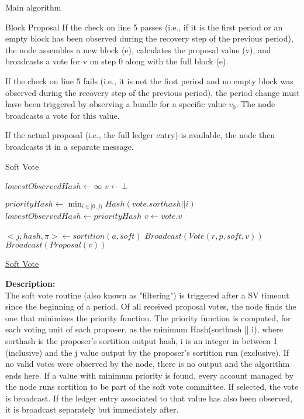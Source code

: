 \documentclass[10pt,a4paper]{article}
\begin{document}
\begin{section}{Main algorithm}
\begin{subsection}{Block Proposal}
If the check on line 5 passes (i.e., if it is the first period or an empty block
 has been observed during the recovery step of the previous period), 
 the node assembles a new block (e), calculates the proposal value (v), 
 and broadcasts a vote for v on step 0 along with the full block (e).

If the check on line 5 fails (i.e., it is not the first period and no 
empty block was observed during the recovery step of the previous period), 
the period change must have been triggered by observing a bundle for a specific value $v_0$. 
The node broadcasts a vote for this value.

If the actual proposal (i.e., the full ledger entry) is available, the node then broadcasts it 
in a separate message.


\end{subsection}
\begin{subsection}{Soft Vote}\label{ssect:softvote}

\begin{algorithm}[H]
    \begin{algorithmic}[1]
    \State $lowestObservedHash \gets \infty$
    \State $v \gets \bot$ 


        \State $priorityHash \gets \min_{i \in [0, j)} Hash(vote.sorthash || i)$
            \State $lowestObservedHash \gets priorityHash$
            \State $v \gets vote.v$
        \EndIf    
    \EndFor

        \State $<j, hash, \pi> \gets sortition(a, soft)$
            \State $Broadcast(Vote(r, p, soft, v))$
                \State $Broadcast(Proposal(v))$
            \EndIf
        \EndIf
    \EndFor

    \EndFunction
    \end{algorithmic}
    \caption{\underline{Soft Vote}}
\end{algorithm}

\noindent \textbf{Description:}\\
The soft vote routine (also known as "filtering") is triggered after a SV timeout since the beginning of a period.
Of all received proposal votes, the node finds the one that minimizes the priority function.
The priority function is computed, for each voting unit of each proposer, as the minimum Hash(sorthash || i), where sorthash is
the proposer's sortition output hash, i is an integer in between 1 (inclusive) and the j value output by
the proposer's sortition run (exclusive).
If no valid votes were observed by the node, there is no output and the algorithm ends here.
If a value with minimum priority is found, every account managed by the node runs sortition to be part of 
the soft vote committee.
If selected, the vote is broadcast. If the ledger entry associated to that value has also been observed, it is broadcast
separately but immediately after.


\end{subsection}
\end{section}
\end{document}
